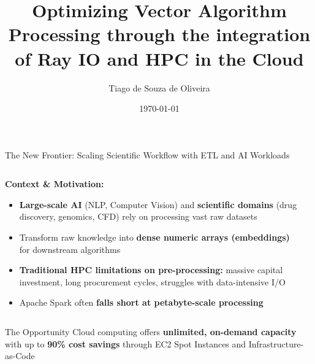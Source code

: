 \documentclass[aspectratio=169]{beamer}
\title[Optimizing Vector Algorithm Processing]{Optimizing Vector Algorithm Processing through the integration of Ray IO and HPC in the Cloud}
\author{Tiago de Souza de Oliveira}
\institute[University]{
    Master's Thesis Defense \\
    Computer Science Department
}
\date{\today}
\begin{document}
\frame{\titlepage}

\begin{frame}{The New Frontier: Scaling Scientific Workflow with ETL and AI Workloads}
    \begin{columns}
        \begin{column}{0.6\textwidth}
            \textbf{Context \& Motivation:}
            \begin{itemize}
                \item \textbf{Large-scale AI} (NLP, Computer Vision) and \textbf{scientific domains} (drug discovery, genomics, CFD) rely on processing vast raw datasets
                \item Transform raw knowledge into \textcolor{rayblue}{\textbf{dense numeric arrays (embeddings)}} for downstream algorithms
                \item \textbf{Traditional HPC limitations on pre-processing:} massive capital investment, long procurement cycles, struggles with data-intensive I/O
                \item Apache Spark often \textbf{falls short at petabyte-scale processing}
            \end{itemize}
        \end{column}
        \begin{column}{0.4\textwidth}
        \end{column}
    \end{columns}
    
    \vspace{0.3cm}
    \begin{alertblock}{The Opportunity}
        Cloud computing offers \textbf{unlimited, on-demand capacity} with up to \textcolor{awsorange}{\textbf{90\% cost savings}} through EC2 Spot Instances and Infrastructure-as-Code
    \end{alertblock}
\end{frame}
\end{document}
